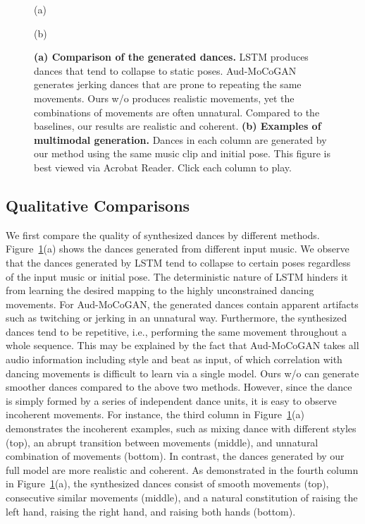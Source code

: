\documentclass{article}
\newlength\figmargin
\newlength\secmargin
\newlength\subsecmargin
\newcommand{\figref}[1]{Figure~\ref{fig:#1}}
\begin{document}
\begin{figure}
    \begin{minipage}[t]{.49\textwidth}
    \centering
    (a)
    \end{minipage}
    \begin{minipage}[t]{.49\textwidth}
    \centering
    (b)
    \end{minipage}
    \caption{
    \textbf{(a) Comparison of the generated dances.}
LSTM produces dances that tend to collapse to static poses.
Aud-MoCoGAN generates jerking dances that are prone to repeating the same movements.
Ours w/o  produces realistic movements, yet the combinations of movements are often unnatural.
Compared to the baselines, our results are realistic and coherent.
\textbf{(b) Examples of multimodal generation.}
Dances in each column are generated by our method using the same music clip and initial pose.
This figure is best viewed via Acrobat Reader. Click each column to play. 
    }
    \label{fig:compare}
    \vspace{\figmargin}
     \vspace{-2mm}
\end{figure}


\vspace{\subsecmargin}
\subsection{Qualitative Comparisons}
\label{subsec:qual}
\vspace{\subsecmargin}
We first compare the quality of synthesized dances by different methods.
\figref{compare}(a) shows the dances generated from different input music.
We observe that the dances generated by LSTM tend to collapse to certain poses regardless of the input music or initial pose.
The deterministic nature of LSTM hinders it from learning the desired mapping to the highly unconstrained dancing movements.
For Aud-MoCoGAN, the generated dances contain apparent artifacts such as twitching or jerking in an unnatural way.
Furthermore, the synthesized dances tend to be repetitive, i.e., performing the same movement throughout a whole sequence.
This may be explained by the fact that Aud-MoCoGAN takes all audio information including style and beat as input, of which correlation with dancing movements is difficult to learn via a single model.
Ours w/o  can generate smoother dances compared to the above two methods.
However, since the dance is simply formed by a series of independent dance units, it is easy to observe incoherent movements.
For instance, the third column in \figref{compare}(a) demonstrates the incoherent examples, such as mixing dance with different styles (top), an abrupt transition between movements (middle), and unnatural combination of movements (bottom).
In contrast, the dances generated by our full model are more realistic and coherent.
As demonstrated in the fourth column in \figref{compare}(a), the synthesized dances consist of smooth movements (top), consecutive similar movements (middle), and a natural constitution of raising the left hand, raising the right hand, and raising both hands (bottom).
\end{document}
